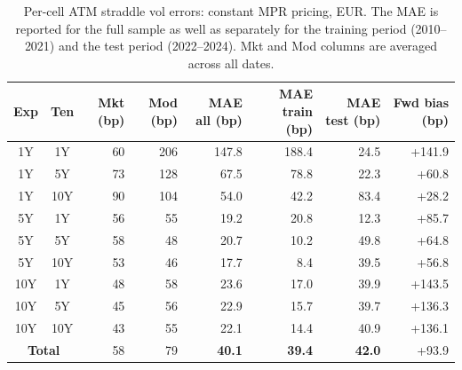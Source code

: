 \begin{table}[H]
\centering
\caption{Per-cell ATM straddle vol errors: constant MPR pricing, EUR. The MAE is reported for the full sample as well as separately for the training period (2010--2021) and the test period (2022--2024). Mkt and Mod columns are averaged across all dates.}
\label{tab:constant_mpr_per_cell_merged}
\small
\begin{tabular}{@{}ccrrrrrr@{}}
\toprule
\textbf{Exp} & \textbf{Ten} & \textbf{Mkt (bp)} & \textbf{Mod (bp)} & \textbf{MAE all (bp)} & \textbf{MAE train (bp)} & \textbf{MAE test (bp)} & \textbf{Fwd bias (bp)} \\
\midrule
  1Y & 1Y & 60 & 206 & 147.8 & 188.4 & 24.5 & +141.9 \\
  1Y & 5Y & 73 & 128 & 67.5 & 78.8 & 22.3 & +60.8 \\
  1Y & 10Y & 90 & 104 & 54.0 & 42.2 & 83.4 & +28.2 \\
  \midrule
  5Y & 1Y & 56 & 55 & 19.2 & 20.8 & 12.3 & +85.7 \\
  5Y & 5Y & 58 & 48 & 20.7 & 10.2 & 49.8 & +64.8 \\
  5Y & 10Y & 53 & 46 & 17.7 & 8.4 & 39.5 & +56.8 \\
  \midrule
  10Y & 1Y & 48 & 58 & 23.6 & 17.0 & 39.9 & +143.5 \\
  10Y & 5Y & 45 & 56 & 22.9 & 15.7 & 39.7 & +136.3 \\
  10Y & 10Y & 43 & 55 & 22.1 & 14.4 & 40.9 & +136.1 \\
\midrule
  \multicolumn{2}{c}{\textbf{Total}} & 58 & 79 & \textbf{40.1} & \textbf{39.4} & \textbf{42.0} & +93.9 \\
\bottomrule
\end{tabular}
\end{table}
